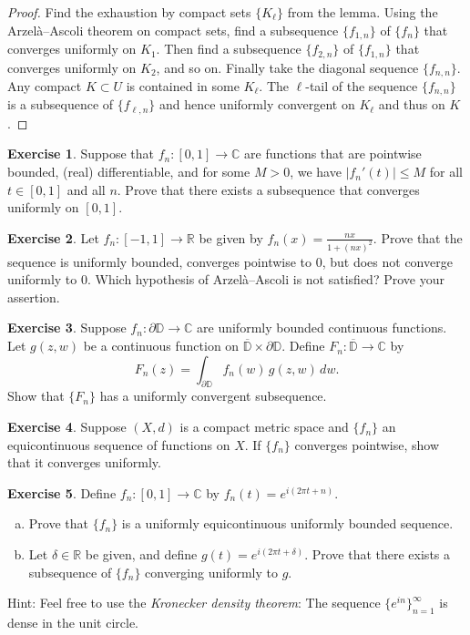 \documentclass[12pt,openany]{book}
\newcommand{\sabs}[1]{\lvert {#1} \rvert}
\newcommand{\C}{{\mathbb{C}}}
\newcommand{\R}{{\mathbb{R}}}
\newcommand{\D}{{\mathbb{D}}}
\newcommand{\myindex}[1]{#1\index{#1}}
\theoremstyle{plain}
\theoremstyle{remark}
\theoremstyle{definition}
\newenvironment{exbox}{%
    \def\FrameCommand{\vrule width 1pt \relax\hspace{10pt}}%
    \MakeFramed{\advance\hsize-\width\FrameRestore}%
}{%
    \endMakeFramed
}
\newenvironment{exparts}{%
    \leavevmode\begin{enumerate}[a),noitemsep,topsep=0pt,parsep=0pt,partopsep=0pt]
}{%
    \end{enumerate}
}
\theoremstyle{exercise}
\newtheorem{exercise}{Exercise}[section]
\theoremstyle{example}
\begin{document}
\begin{proof}
Find the exhaustion by compact sets $\{ K_\ell \}$ from the lemma.
Using the Arzel\`a--Ascoli theorem on compact sets,
find a subsequence $\{ f_{1,n} \}$  of $\{f_n\}$ that converges uniformly
on $K_1$.  Then find a subsequence
$\{ f_{2,n} \}$ of
$\{ f_{1,n} \}$ that converges uniformly on $K_2$, and so on.
Finally take the diagonal sequence $\{ f_{n,n} \}$.
Any compact $K \subset U$
is contained in some $K_\ell$.  The $\ell$-tail of the sequence $\{ f_{n,n}
\}$ is a subsequence of $\{ f_{\ell,n} \}$ and hence uniformly convergent on
$K_\ell$ and thus on $K$.
\end{proof}

\begin{exbox}
\begin{exercise}
Suppose that $f_n \colon [0,1] \to \C$ are functions that are pointwise
bounded, (real) differentiable, and for some $M> 0$, we have
$\sabs{f_n'(t)} \leq M$ for all $t \in [0,1]$ and all $n$.  Prove that there
exists a subsequence that converges uniformly on $[0,1]$.
\end{exercise}

\begin{exercise}
Let $f_n \colon [-1,1] \to \R$ be given by $f_n(x) = \frac{nx}{1+{(nx)}^2}$.
Prove that the sequence is uniformly bounded, converges pointwise to 0, but
does not converge uniformly to 0.
Which hypothesis of Arzel\`a--Ascoli
is not satisfied?  Prove your assertion.
\end{exercise}

\begin{exercise}
Suppose 
$f_n \colon \partial \D \to \C$ are uniformly bounded continuous functions.
Let $g(z,w)$ be a continuous function on $\overline{\D} \times \partial \D$.
Define
$F_n \colon \overline{\D} \to \C$ by
\begin{equation*}
F_n(z)  = \int_{\partial \D} f_n(w)\, g(z,w) \, dw . 
\end{equation*}
Show that $\{ F_n \}$ has a uniformly convergent subsequence.
\end{exercise}

\begin{exercise}
Suppose $(X,d)$ is a compact metric space and $\{ f_n \}$ an equicontinuous
sequence of functions on $X$.  If $\{ f_n \}$ converges
pointwise, show that it converges uniformly.
\end{exercise}

\begin{exercise}
Define $f_n \colon [0,1] \to \C$ by $f_n(t) = e^{i(2\pi t + n)}$.
\begin{exparts}
\item
Prove that $\{ f_n \}$ is a uniformly equicontinuous
uniformly bounded sequence.
\item
Let $\delta \in \R$ be given, and define $g(t) = e^{i(2\pi t + \delta)}$.
Prove that there exists 
a subsequence of $\{ f_n \}$ converging uniformly to $g$.
\end{exparts}
Hint: Feel free to use the \emph{\myindex{Kronecker density theorem}}:
The sequence $\{ e^{in} \}_{n=1}^\infty$ is dense in the unit circle.
\end{exercise}
\end{exbox}
\end{document}
